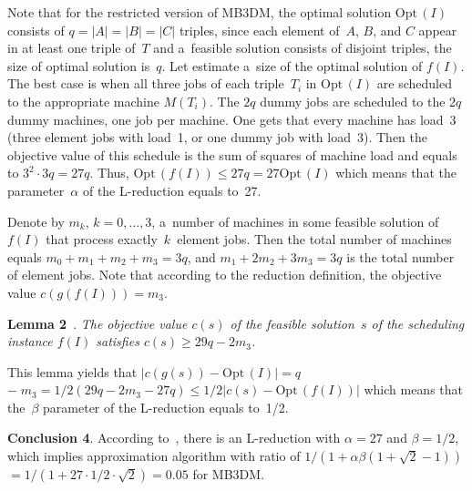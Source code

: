 \begin{multicols}{2}
Note that for the restricted version of MB3DM, the optimal solution
$\mathrm{Opt}\,(I)$ consists of $q=|A|=|B|=|C|$ triples, since each element of~$A$,
$B$, and $C$ appear in at least one triple of~$T$ and a~feasible
solution consists of disjoint triples, the size of optimal solution
is~$q$. Let estimate a~size of the optimal solution of $f(I)$.
The best case is when all three jobs of each triple~$T_i$ in
$\mathrm{Opt}\,(I)$ are scheduled to the appropriate machine $M(T_i)$. The $2q$
dummy jobs are scheduled to the $2q$ dummy machines, one job per
machine. One gets that every machine has load~3 (three element jobs
with load~1, or one dummy job with load~3). Then the objective value
of this schedule is the sum of squares of machine load and equals to
$3^2 \cdot 3q = 27q$. Thus, $\mathrm{Opt}\,(f(I)) \leq 27q = 27\mathrm{Opt}\,(I)$ which
means that the parameter~$\alpha$ of the L-reduction equals to~27.

Denote by $m_k$, $k=0,\ldots, 3$, a~number of machines in some feasible
solution of $f(I)$ that process exactly~$k$~element jobs. Then the
total number of machines equals $m_0+m_1+m_2+m_3 = 3q$, and
$m_1+2m_2+3m_3 = 3q$ is the total number of element jobs. Note that
according to the reduction definition, the objective value
$c(g(f(I))) = m_3$.

\smallskip

\noindent
\textbf{Lemma 2}~\cite{AERW2002}.
\textit{The objective value $c(s)$ of the feasible solution~$s$ of the
scheduling instance $f(I)$ satisfies $c(s) \geq 29q-2m_3$.}

\smallskip

This lemma yields that $|c(g(s))-\mathrm{Opt}\,(I)| = q$\linebreak $-\;m_3 =
1/2(29q-2m_3-27q) \leq 1/2|c(s)-\mathrm{Opt}\,(f(I))|$ which means that
the~$\beta$ parameter of the L-reduction equals to~1/2.

\smallskip

\noindent
\textbf{Conclusion 4}.
According to~\cite{AERW2002}, there is an L-reduction with
$\alpha=27$ and $\beta=1/2$, which implies approximation algorithm
with ratio of
$1/(1+\alpha\beta(1+\sqrt{2}-1))$\linebreak $=1/(1+27\cdot1/2\cdot\sqrt{2})=0.05$
for {MB3DM}.

\smallskip


\end{multicols}
